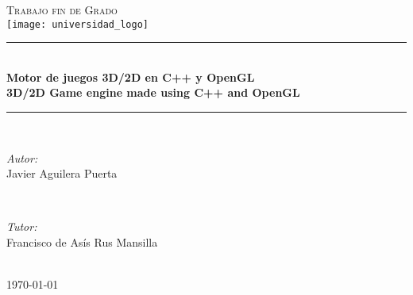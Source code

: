 \begin{titlepage}

\newcommand{\HRule}{\rule{\linewidth}{0.5mm}} %

\center %


\textsc{\LARGE Trabajo fin de Grado}\\[1.8cm]


\texttt{[image: universidad\_logo]}


\HRule \\[0.2cm]
{ \Large \bfseries
Motor de juegos 3D/2D en C++ y OpenGL
}\\[0.5cm]
{ \Large \bfseries 3D/2D Game engine made using C++ and OpenGL
}\\[0.2cm]
\HRule \\[5cm]


\begin{minipage}{0.4\textwidth}
\begin{flushleft} \large
\emph{Autor:}\\
Javier Aguilera Puerta
\end{flushleft}
\end{minipage}
~
\begin{minipage}{0.4\textwidth}
\begin{flushright} \large
\vspace{9mm}
\emph{Tutor:} \\
Francisco de Asís Rus Mansilla
\end{flushright}
\end{minipage}\\[2cm]


{\large \today}\\[2cm] %

\vfill %

\end{titlepage}

